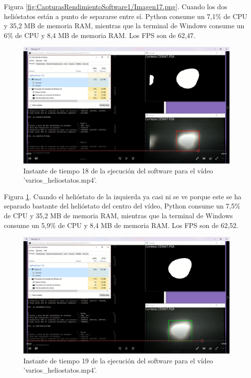 Figura \ref{fig:CapturasRendimientoSoftware1/Imagen17.png}. Cuando los dos helióstatos están a punto de separarse entre sí. Python consume un 7,1\% de CPU y 35,2 MB de memoria RAM, mientras que la terminal de Windows consume un 6\% de CPU y 8,4 MB de memoria RAM. Los FPS son de 62,47.\\[20pt]

\begin{figure}[h!]
  	\centering
	\includegraphics[width=\textwidth]{CapturasRendimientoSoftware1/Imagen18.png}
	\caption{Instante de tiempo 18 de la ejecución del software para el vídeo 'varios\_heliostatos.mp4'.
	\label{fig:CapturasRendimientoSoftware1/Imagen18.png}}
\end{figure}

Figura \ref{fig:CapturasRendimientoSoftware1/Imagen18.png}. Cuando el helióstato de la izquierda ya casi ni se ve porque este se ha separado bastante del helióstato del centro del vídeo, Python consume un 7,5\% de CPU y 35,2 MB de memoria RAM, mientras que la terminal de Windows consume un 5,9\% de CPU y 8,4 MB de memoria RAM. Los FPS son de 62,52.\\[20pt]

\begin{figure}[h!]
  	\centering
	\includegraphics[width=\textwidth]{CapturasRendimientoSoftware1/Imagen19.png}
	\caption{Instante de tiempo 19 de la ejecución del software para el vídeo 'varios\_heliostatos.mp4'.
	\label{fig:CapturasRendimientoSoftware1/Imagen19.png}}
\end{figure}

